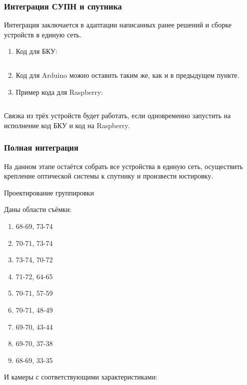 \solutionSection

\subsubsection*{Интеграция СУПН и спутника}

Интеграция заключается в адаптации написанных ранее решений и сборке устройств в единую сеть.

\begin{enumerate}
    \item Код для БКУ:
    
    \inputminted[fontsize=\footnotesize, linenos]{python}{final/command_tour/dzz/task_03/source_1.py}

    \item Код для Arduino можно оставить таким же, как и в предыдущем пункте.
    \item Пример кода для Raspberry:
    
    \inputminted[fontsize=\footnotesize, linenos]{python}{final/command_tour/dzz/task_03/source_2.py}
\end{enumerate}

Связка из трёх устройств будет работать, если одновременно запустить на исполнение код БКУ и код на Raspberry.

\subsubsection*{Полная интеграция}

На данном этапе остаётся собрать все устройства в единую сеть, осуществить крепление оптической системы к спутнику и произвести юстировку. 

Проектирование группировки

Даны области съёмки:
\begin{enumerate}
    \item 68-69, 73-74
    \item 70-71, 73-74
    \item 73-74, 70-72
    \item 71-72, 64-65
    \item 70-71, 57-59
    \item 70-71, 48-49
    \item 69-70, 43-44
    \item 69-70, 37-38
    \item 68-69, 33-35
\end{enumerate}

И камеры с соответствующими характеристиками:

